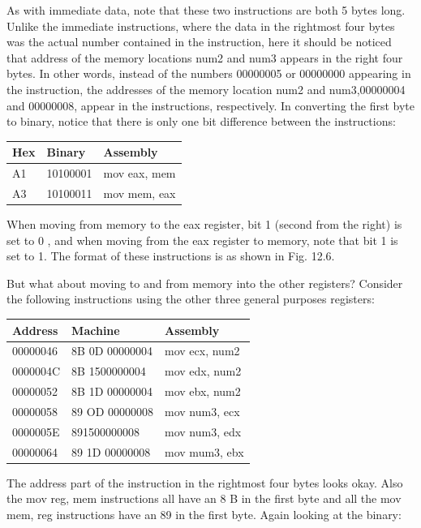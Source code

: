 \documentclass[10pt]{book}
\begin{document}
As with immediate data, note that these two instructions are both 5 bytes long. Unlike the immediate instructions, where the data in the rightmost four bytes was the actual number contained in the instruction, here it should be noticed that address of the memory locations num2 and num3 appears in the right four bytes. In other words, instead of the numbers 00000005 or 00000000 appearing in the instruction, the addresses of the memory location num2 and num3,00000004 and 00000008, appear in the instructions, respectively. In converting the first byte to binary, notice that there is only one bit difference between the instructions:

\begin{center}
\begin{tabular}{|l|l|l|}
\hline
Hex & Binary & Assembly \\
\hline
A1 & 10100001 & mov eax, mem \\
\hline
A3 & 10100011 & mov mem, eax \\
\hline
\end{tabular}
\end{center}

When moving from memory to the eax register, bit 1 (second from the right) is set to 0 , and when moving from the eax register to memory, note that bit 1 is set to 1. The format of these instructions is as shown in Fig. 12.6.

But what about moving to and from memory into the other registers? Consider the following instructions using the other three general purposes registers:

\begin{center}
\begin{tabular}{|l|l|l|}
\hline
Address & Machine & Assembly \\
\hline
00000046 & 8B 0D 00000004 & mov ecx, num2 \\
\hline
0000004C & 8B 1500000004 & mov edx, num2 \\
\hline
00000052 & 8B 1D 00000004 & mov ebx, num2 \\
\hline
00000058 & 89 OD 00000008 & mov num3, ecx \\
\hline
0000005E & 891500000008 & mov num3, edx \\
\hline
00000064 & 89 1D 00000008 & mov mum3, ebx \\
\hline
\end{tabular}
\end{center}

The address part of the instruction in the rightmost four bytes looks okay. Also the mov reg, mem instructions all have an 8 B in the first byte and all the mov mem, reg instructions have an 89 in the first byte. Again looking at the binary:
\end{document}
